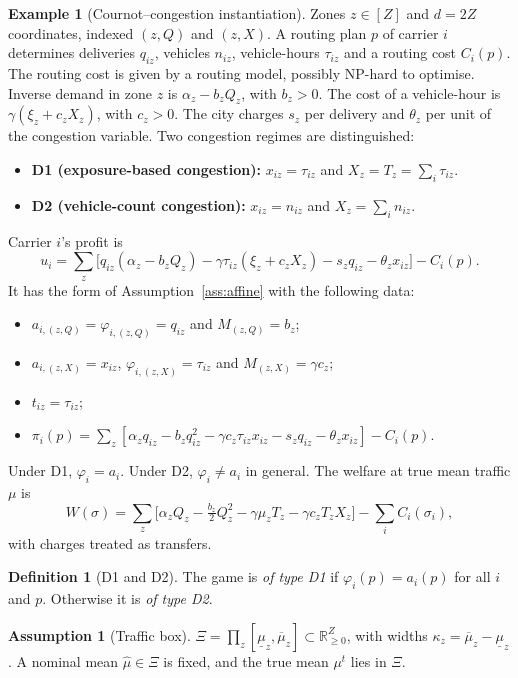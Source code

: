 \documentclass[11pt]{article}
\theoremstyle{definition}
\newtheorem{definition}[theorem]{Definition}
\newtheorem{assumption}{Assumption}
\newtheorem{example}[theorem]{Example}
\theoremstyle{remark}
\newcommand{\R}{\mathbb{R}}
\begin{document}
\begin{example}[Cournot--congestion instantiation]\label{ex:cc}
Zones $z\in[Z]$ and $d=2Z$ coordinates, indexed $(z,Q)$ and $(z,X)$. A routing plan $p$ of carrier $i$ determines deliveries $q_{iz}$, vehicles $n_{iz}$, vehicle-hours $\tau_{iz}$ and a routing cost $C_i(p)$. The routing cost is given by a routing model, possibly NP-hard to optimise. Inverse demand in zone $z$ is $\alpha_z-b_zQ_z$, with $b_z>0$. The cost of a vehicle-hour is $\gamma(\xi_z+c_zX_z)$, with $c_z>0$. The city charges $s_z$ per delivery and $\theta_z$ per unit of the congestion variable. Two congestion regimes are distinguished:
\begin{itemize}
\item \textbf{D1 (exposure-based congestion):} $x_{iz}=\tau_{iz}$ and $X_z=T_z=\sum_i\tau_{iz}$.
\item \textbf{D2 (vehicle-count congestion):} $x_{iz}=n_{iz}$ and $X_z=\sum_in_{iz}$.
\end{itemize}
Carrier $i$'s profit is
\[
\textstyle u_i=\sum_z\big[q_{iz}(\alpha_z-b_zQ_z)-\gamma\tau_{iz}(\xi_z+c_zX_z)-s_zq_{iz}-\theta_zx_{iz}\big]-C_i(p).
\]
It has the form of Assumption~\ref{ass:affine} with the following data:
\begin{itemize}
\item $a_{i,(z,Q)}=\varphi_{i,(z,Q)}=q_{iz}$ and $M_{(z,Q)}=b_z$;
\item $a_{i,(z,X)}=x_{iz}$, $\varphi_{i,(z,X)}=\tau_{iz}$ and $M_{(z,X)}=\gamma c_z$;
\item $t_{iz}=\tau_{iz}$;
\item $\pi_i(p)=\sum_z[\alpha_zq_{iz}-b_zq_{iz}^2-\gamma c_z\tau_{iz}x_{iz}-s_zq_{iz}-\theta_zx_{iz}]-C_i(p)$.
\end{itemize}
Under D1, $\varphi_i=a_i$. Under D2, $\varphi_i\neq a_i$ in general. The welfare at true mean traffic $\mu$ is
\[\textstyle W(\sigma)=\sum_z\big[\alpha_zQ_z-\tfrac{b_z}{2}Q_z^2-\gamma\mu_zT_z-\gamma c_zT_zX_z\big]-\sum_iC_i(\sigma_i),\]
with charges treated as transfers.
\end{example}

\begin{definition}[D1 and D2]\label{def:D1D2}
The game is \emph{of type D1} if $\varphi_i(p)=a_i(p)$ for all $i$ and $p$. Otherwise it is \emph{of type D2}.
\end{definition}

\begin{assumption}[Traffic box]\label{ass:traffic}
$\Xi=\prod_{z}[\underline\mu_z,\overline\mu_z]\subset\R^Z_{\ge0}$, with widths $\kappa_z=\overline\mu_z-\underline\mu_z$. A nominal mean $\hat\mu\in\Xi$ is fixed, and the true mean $\mu^{t}$ lies in $\Xi$.
\end{assumption}
\end{document}
